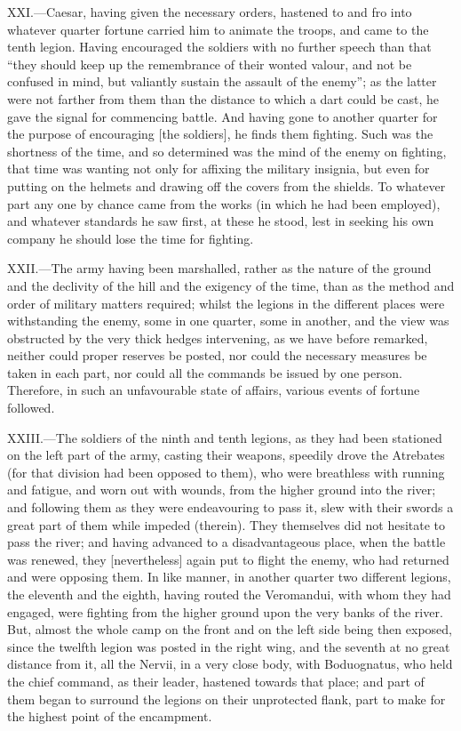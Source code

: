 XXI.—Caesar, having given the necessary orders, hastened to and fro
into whatever quarter fortune carried him to animate the troops, and
came to the tenth legion. Having encouraged the soldiers with no further
speech than that ``they should keep up the remembrance of their wonted
valour, and not be confused in mind, but valiantly sustain the assault
of the enemy''; as the latter were not farther from them than the
distance to which a dart could be cast, he gave the signal for
commencing battle. And having gone to another quarter for the purpose of
encouraging [the soldiers], he finds them fighting. Such was the
shortness of the time, and so determined was the mind of the enemy on
fighting, that time was wanting not only for affixing the military
insignia, but even for putting on the helmets and drawing off the covers
from the shields. To whatever part any one by chance came from the works
(in which he had been employed), and whatever standards he saw first, at
these he stood, lest in seeking his own company he should lose the time
for fighting.

XXII.—The army having been marshalled, rather as the nature of the
ground and the declivity of the hill and the exigency of the time, than
as the method and order of military matters required; whilst the legions
in the different places were withstanding the enemy, some in one
quarter, some in another, and the view was obstructed by the very thick
hedges intervening, as we have before remarked, neither could proper
reserves be posted, nor could the necessary measures be taken in each
part, nor could all the commands be issued by one person. Therefore, in
such an unfavourable state of affairs, various events of fortune
followed.

XXIII.—The soldiers of the ninth and tenth legions, as they had been
stationed on the left part of the army, casting their weapons, speedily
drove the Atrebates (for that division had been opposed to them), who
were breathless with running and fatigue, and worn out with wounds, from
the higher ground into the river; and following them as they were
endeavouring to pass it, slew with their swords a great part of them
while impeded (therein). They themselves did not hesitate to pass the
river; and having advanced to a disadvantageous place, when the battle
was renewed, they [nevertheless] again put to flight the enemy, who had
returned and were opposing them. In like manner, in another quarter two
different legions, the eleventh and the eighth, having routed the
Veromandui, with whom they had engaged, were fighting from the higher
ground upon the very banks of the river. But, almost the whole camp on
the front and on the left side being then exposed, since the twelfth
legion was posted in the right wing, and the seventh at no great
distance from it, all the Nervii, in a very close body, with
Boduognatus, who held the chief command, as their leader, hastened
towards that place; and part of them began to surround the legions on
their unprotected flank, part to make for the highest point of the
encampment.

